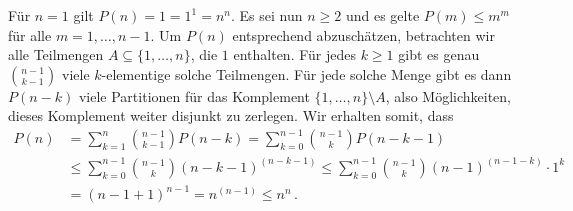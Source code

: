 Für $n = 1$ gilt $P(n) = 1 = 1^1 = n^n$.
Es sei nun $n \geq 2$ und es gelte $P(m) \leq m^m$ für alle $m = 1, \dotsc, n-1$.
Um $P(n)$ entsprechend abzuschätzen, betrachten wir alle Teilmengen $A \subseteq \{1, \dotsc, n\}$, die $1$ enthalten.  Für jedes $k \geq 1$ gibt es genau $\binom{n-1}{k-1}$ viele $k$-elementige solche Teilmengen.
Für jede solche Menge gibt es dann $P(n-k)$ viele Partitionen für das Komplement $\{1, \dotsc, n\} \setminus A$, also Möglichkeiten, dieses Komplement weiter disjunkt zu zerlegen.
Wir erhalten somit, dass
\begin{align*}
        P(n)
  &=    \sum_{k=1}^n \binom{n-1}{k-1} P(n-k)
   =    \sum_{k=0}^{n-1} \binom{n-1}{k} P(n-k-1)
  \\
  &\leq \sum_{k=0}^{n-1} \binom{n-1}{k} (n-k-1)^{(n-k-1)}
   \leq \sum_{k=0}^{n-1} \binom{n-1}{k} (n-1)^{(n-1-k)} \cdot 1^k
  \\
  &=    (n-1 + 1)^{n-1}
   =   n^{(n-1)}
   \leq  n^n \,.
\end{align*}

